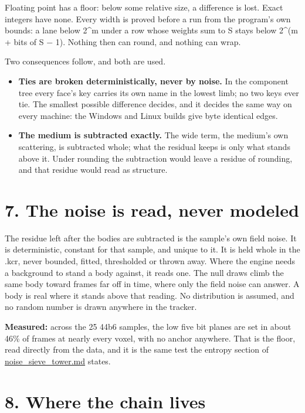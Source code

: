 Floating point has a floor: below some relative size, a difference is lost. Exact integers have none. Every width is proved before a run from the program's own bounds: a lane below 2\textasciicircum{}m under a row whose weights sum to S stays below 2\textasciicircum{}(m + bits of S − 1). Nothing then can round, and nothing can wrap.

Two consequences follow, and both are used.

\begin{itemize}
\item \textbf{Ties are broken deterministically, never by noise.} In the component tree every face's key carries its own name in the lowest limb; no two keys ever tie. The smallest possible difference decides, and it decides the same way on every machine: the Windows and Linux builds give byte identical edges.
\item \textbf{The medium is subtracted exactly.} The wide term, the medium's own scattering, is subtracted whole; what the residual keeps is only what stands above it. Under rounding the subtraction would leave a residue of rounding, and that residue would read as structure.
\end{itemize}

\section{\texorpdfstring{7. The noise is read, never modeled}{7. The noise is read, never modeled}}

The residue left after the bodies are subtracted is the sample's own field noise. It is deterministic, constant for that sample, and unique to it. It is held whole in the .kcr, never bounded, fitted, thresholded or thrown away. Where the engine needs a background to stand a body against, it reads one. The null draws climb the same body toward frames far off in time, where only the field noise can answer. A body is real where it stands above that reading. No distribution is assumed, and no random number is drawn anywhere in the tracker.

\textbf{Measured:} across the 25 44b6 samples, the low five bit planes are set in about 46\% of frames at nearly every voxel, with no anchor anywhere. That is the floor, read directly from the data, and it is the same test the entropy section of \hyperref[chap:noise-sieve-tower]{noise\_\allowbreak{}sieve\_\allowbreak{}tower.md} states.

\section{\texorpdfstring{8. Where the chain lives}{8. Where the chain lives}}

